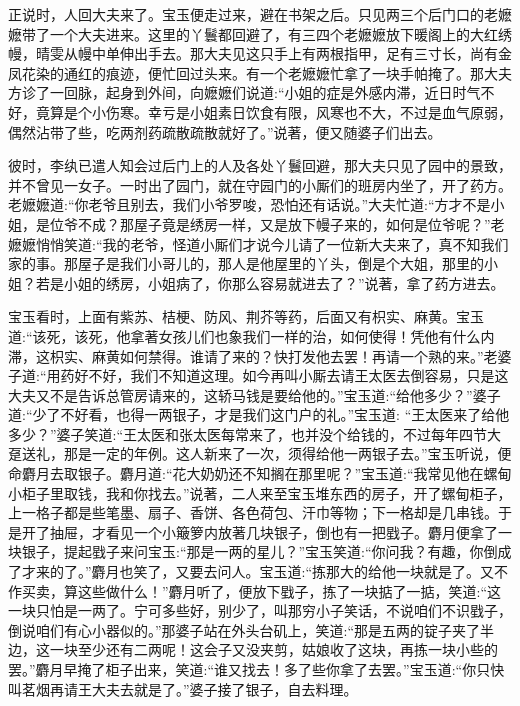 \begin{parag}
    正说时，人回大夫来了。宝玉便走过来，避在书架之后。只见两三个后门口的老嬷嬷带了一个大夫进来。这里的丫鬟都回避了，有三四个老嬷嬷放下暖阁上的大红绣幔，晴雯从幔中单伸出手去。那大夫见这只手上有两根指甲，足有三寸长，尚有金凤花染的通红的痕迹，便忙回过头来。有一个老嬷嬷忙拿了一块手帕掩了。那大夫方诊了一回脉，起身到外间，向嬷嬷们说道:“小姐的症是外感内滞，近日时气不好，竟算是个小伤寒。幸亏是小姐素日饮食有限，风寒也不大，不过是血气原弱，偶然沾带了些，吃两剂药疏散疏散就好了。”说著，便又随婆子们出去。
\end{parag}


\begin{parag}
    彼时，李纨已遣人知会过后门上的人及各处丫鬟回避，那大夫只见了园中的景致，并不曾见一女子。一时出了园门，就在守园门的小厮们的班房内坐了，开了药方。老嬷嬷道:“你老爷且别去，我们小爷罗唆，恐怕还有话说。”大夫忙道:“方才不是小姐，是位爷不成？那屋子竟是绣房一样，又是放下幔子来的，如何是位爷呢？”老嬷嬷悄悄笑道:“我的老爷，怪道小厮们才说今儿请了一位新大夫来了，真不知我们家的事。那屋子是我们小哥儿的，那人是他屋里的丫头，倒是个大姐，那里的小姐？若是小姐的绣房，小姐病了，你那么容易就进去了？”说著，拿了药方进去。
\end{parag}


\begin{parag}
    宝玉看时，上面有紫苏、桔梗、防风、荆芥等药，后面又有枳实、麻黄。宝玉道:“该死，该死，他拿著女孩儿们也象我们一样的治，如何使得！凭他有什么内滞，这枳实、麻黄如何禁得。谁请了来的？快打发他去罢！再请一个熟的来。”老婆子道:“用药好不好，我们不知道这理。如今再叫小厮去请王太医去倒容易，只是这大夫又不是告诉总管房请来的，这轿马钱是要给他的。”宝玉道:“给他多少？”婆子道:“少了不好看，也得一两银子，才是我们这门户的礼。”宝玉道: “王太医来了给他多少？”婆子笑道:“王太医和张太医每常来了，也并没个给钱的，不过每年四节大趸送礼，那是一定的年例。这人新来了一次，须得给他一两银子去。”宝玉听说，便命麝月去取银子。麝月道:“花大奶奶还不知搁在那里呢？”宝玉道:“我常见他在螺甸小柜子里取钱，我和你找去。”说著，二人来至宝玉堆东西的房子，开了螺甸柜子，上一格子都是些笔墨、扇子、香饼、各色荷包、汗巾等物；下一格却是几串钱。于是开了抽屉，才看见一个小簸箩内放著几块银子，倒也有一把戥子。麝月便拿了一块银子，提起戥子来问宝玉:“那是一两的星儿？”宝玉笑道:“你问我？有趣，你倒成了才来的了。”麝月也笑了，又要去问人。宝玉道:“拣那大的给他一块就是了。又不作买卖，算这些做什么！”麝月听了，便放下戥子，拣了一块掂了一掂，笑道:“这一块只怕是一两了。宁可多些好，别少了，叫那穷小子笑话，不说咱们不识戥子，倒说咱们有心小器似的。”那婆子站在外头台矶上，笑道:“那是五两的锭子夹了半边，这一块至少还有二两呢！这会子又没夹剪，姑娘收了这块，再拣一块小些的罢。”麝月早掩了柜子出来，笑道:“谁又找去！多了些你拿了去罢。”宝玉道:“你只快叫茗烟再请王大夫去就是了。”婆子接了银子，自去料理。
\end{parag}


